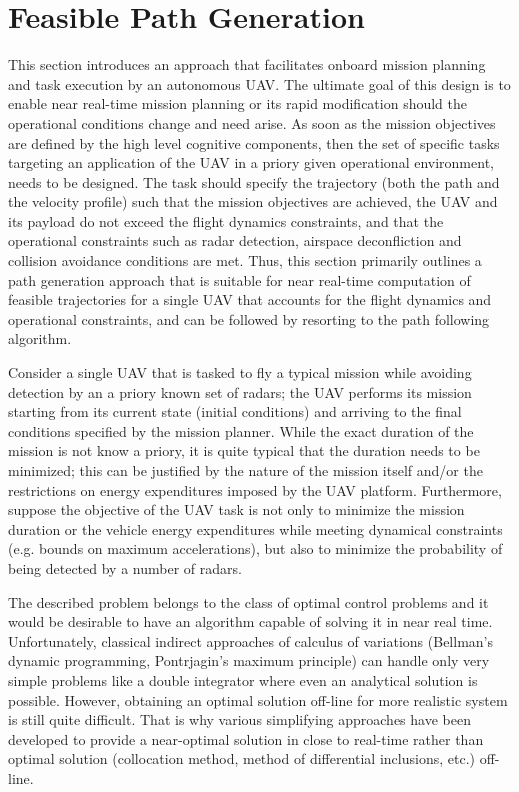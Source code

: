 \documentclass[]{aiaa-tc}%
\begin{document}
\section{Feasible Path Generation}
This section introduces an approach that facilitates onboard mission planning and task
execution by an autonomous UAV. The ultimate goal of this design is to enable near
real-time mission planning or its rapid modification should the operational conditions
change and need arise. As soon as the mission objectives are defined by the high level
cognitive components, then the set of specific tasks targeting an application of the
UAV in a priory given operational environment, needs to be designed. The task should
specify the trajectory (both the path and the velocity profile) such that the mission
objectives are achieved, the UAV and its payload do not exceed the flight dynamics
constraints, and that the operational constraints such as radar detection, airspace
deconfliction and collision avoidance conditions are met. Thus, this section primarily outlines a
path generation approach that is suitable for near real-time computation of feasible
trajectories for a single UAV that accounts for the flight dynamics and operational
constraints, and can be followed by resorting to the path following
algorithm\cite{JGCD10_PFL1aug}.

Consider a single UAV that is tasked to fly a typical mission while avoiding detection
by an a priory known set of radars; the UAV performs its mission starting from its
current state (initial conditions) and arriving to the final conditions specified by
the mission planner. While the exact duration of the mission is not know a priory, it
is quite typical that the duration needs to be minimized; this can be justified by the
nature of the mission itself and/or the restrictions on energy expenditures imposed by
the UAV platform. Furthermore, suppose the objective of the UAV task is not only to
minimize the mission duration or the vehicle energy expenditures while meeting
dynamical constraints (e.g. bounds on maximum accelerations), but also to minimize the
probability of being detected by a number of radars.

The described problem belongs to the class of optimal control problems and it would be
desirable to have an algorithm capable of solving it in near real time. Unfortunately,
classical indirect approaches of calculus of variations (Bellman’s dynamic programming,
Pontrjagin’s maximum principle) can handle only very simple problems like a double
integrator where even an analytical solution is possible. However, obtaining an optimal
solution off-line for more realistic system is still quite difficult. That is why
various simplifying approaches have been developed to provide a near-optimal solution
in close to real-time rather than optimal solution (collocation method, method of
differential inclusions, etc.) off-line.
\end{document}
